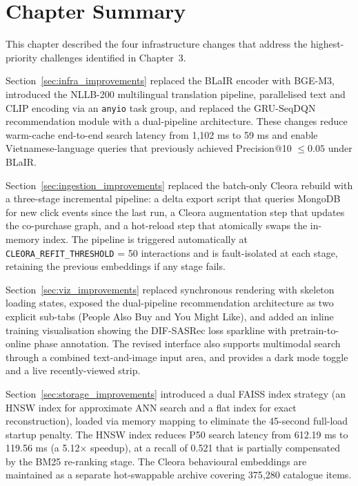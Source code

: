 \section{Chapter Summary}
\label{sec:chap4_conclusion}

This chapter described the four infrastructure changes that address the highest-priority challenges identified in Chapter~3.

Section~\ref{sec:infra_improvements} replaced the BLaIR encoder with BGE-M3, introduced the NLLB-200 multilingual translation pipeline, parallelised text and CLIP encoding via an \texttt{anyio} task group, and replaced the GRU-SeqDQN recommendation module with a dual-pipeline architecture.
These changes reduce warm-cache end-to-end search latency from 1{,}102 ms to 59 ms and enable Vietnamese-language queries that previously achieved Precision@10 $\leq 0.05$ under BLaIR.

Section~\ref{sec:ingestion_improvements} replaced the batch-only Cleora rebuild with a three-stage incremental pipeline: a delta export script that queries MongoDB for new click events since the last run, a Cleora augmentation step that updates the co-purchase graph, and a hot-reload step that atomically swaps the in-memory index.
The pipeline is triggered automatically at \texttt{CLEORA\_REFIT\_THRESHOLD} = 50 interactions and is fault-isolated at each stage, retaining the previous embeddings if any stage fails.

Section~\ref{sec:viz_improvements} replaced synchronous rendering with skeleton loading states, exposed the dual-pipeline recommendation architecture as two explicit sub-tabs (People Also Buy and You Might Like), and added an inline training visualisation showing the DIF-SASRec loss sparkline with pretrain-to-online phase annotation.
The revised interface also supports multimodal search through a combined text-and-image input area, and provides a dark mode toggle and a live recently-viewed strip.

Section~\ref{sec:storage_improvements} introduced a dual FAISS index strategy (an HNSW index for approximate ANN search and a flat index for exact reconstruction), loaded via memory mapping to eliminate the 45-second full-load startup penalty.
The HNSW index reduces P50 search latency from 612.19 ms to 119.56 ms (a 5.12$\times$ speedup), at a recall of 0.521 that is partially compensated by the BM25 re-ranking stage.
The Cleora behavioural embeddings are maintained as a separate hot-swappable archive covering 375{,}280 catalogue items.

